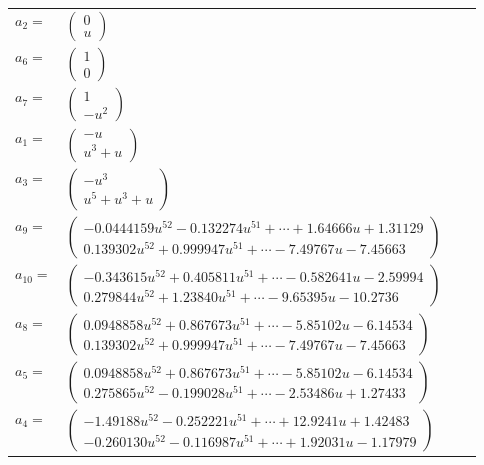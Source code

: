 \documentclass[1p]{elsarticle_modified}
\theoremstyle{definition}
\begin{document}
\begin{tabular}{m{7pt} m{180pt} m{7pt} m{180pt} }
\flushright $a_{2}=$&$\begin{pmatrix}0\\u\end{pmatrix}$ \\
\flushright $a_{6}=$&$\begin{pmatrix}1\\0\end{pmatrix}$ \\
\flushright $a_{7}=$&$\begin{pmatrix}1\\- u^2\end{pmatrix}$ \\
\flushright $a_{1}=$&$\begin{pmatrix}- u\\u^3+u\end{pmatrix}$ \\
\flushright $a_{3}=$&$\begin{pmatrix}- u^3\\u^5+u^3+u\end{pmatrix}$ \\
\flushright $a_{9}=$&$\begin{pmatrix}-0.0444159 u^{52}-0.132274 u^{51}+\cdots+1.64666 u+1.31129\\0.139302 u^{52}+0.999947 u^{51}+\cdots-7.49767 u-7.45663\end{pmatrix}$ \\
\flushright $a_{10}=$&$\begin{pmatrix}-0.343615 u^{52}+0.405811 u^{51}+\cdots-0.582641 u-2.59994\\0.279844 u^{52}+1.23840 u^{51}+\cdots-9.65395 u-10.2736\end{pmatrix}$ \\
\flushright $a_{8}=$&$\begin{pmatrix}0.0948858 u^{52}+0.867673 u^{51}+\cdots-5.85102 u-6.14534\\0.139302 u^{52}+0.999947 u^{51}+\cdots-7.49767 u-7.45663\end{pmatrix}$ \\
\flushright $a_{5}=$&$\begin{pmatrix}0.0948858 u^{52}+0.867673 u^{51}+\cdots-5.85102 u-6.14534\\0.275865 u^{52}-0.199028 u^{51}+\cdots-2.53486 u+1.27433\end{pmatrix}$ \\
\flushright $a_{4}=$&$\begin{pmatrix}-1.49188 u^{52}-0.252221 u^{51}+\cdots+12.9241 u+1.42483\\-0.260130 u^{52}-0.116987 u^{51}+\cdots+1.92031 u-1.17979\end{pmatrix}$ \\

\end{tabular}
\end{document}
